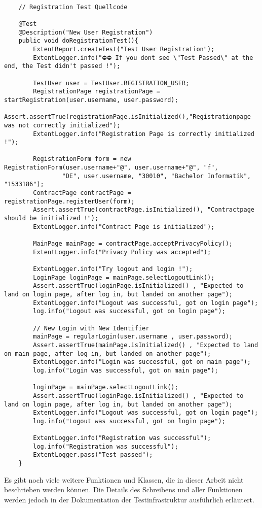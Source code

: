 \begin{lstlisting}[label={lst:reg-test}, caption={Registration Test Quellcode}]

    // Registration Test Quellcode

    @Test
    @Description("New User Registration")
    public void doRegistrationTest(){
        ExtentReport.createTest("Test User Registration");
        ExtentLogger.info("⛔⛔ If you dont see \"Test Passed\" at the end, the Test didn't passed !");

        TestUser user = TestUser.REGISTRATION_USER;
        RegistrationPage registrationPage = startRegistration(user.username, user.password);
        Assert.assertTrue(registrationPage.isInitialized(),"Registrationpage was not correctly initialized");
        ExtentLogger.info("Registration Page is correctly initialized !");

        RegistrationForm form = new RegistrationForm(user.username+"@", user.username+"@", "f",
                "DE", user.username, "30010", "Bachelor Informatik", "1533186");
        ContractPage contractPage = registrationPage.registerUser(form);
        Assert.assertTrue(contractPage.isInitialized(), "Contractpage should be initialized !");
        ExtentLogger.info("Contract Page is initialized");

        MainPage mainPage = contractPage.acceptPrivacyPolicy();
        ExtentLogger.info("Privacy Policy was accepted");

        ExtentLogger.info("Try logout and login !");
        LoginPage loginPage = mainPage.selectLogoutLink();
        Assert.assertTrue(loginPage.isInitialized() , "Expected to land on login page, after log in, but landed on another page");
        ExtentLogger.info("Logout was successful, got on login page");
        log.info("Logout was successful, got on login page");

        // New Login with New Identifier
        mainPage = regularLogin(user.username , user.password);
        Assert.assertTrue(mainPage.isInitialized() , "Expected to land on main page, after log in, but landed on another page");
        ExtentLogger.info("Login was successful, got on main page");
        log.info("Login was successful, got on main page");

        loginPage = mainPage.selectLogoutLink();
        Assert.assertTrue(loginPage.isInitialized() , "Expected to land on login page, after log in, but landed on another page");
        ExtentLogger.info("Logout was successful, got on login page");
        log.info("Logout was successful, got on login page");

        ExtentLogger.info("Registration was successful");
        log.info("Registration was successful");
        ExtentLogger.pass("Test passed");
    }
\end{lstlisting}

Es gibt noch viele weitere Funktionen und Klassen, die in dieser
Arbeit nicht beschrieben werden können. Die Details des Schreibens
und aller Funktionen werden jedoch in der Dokumentation der
Testinfrastruktur ausführlich erläutert.